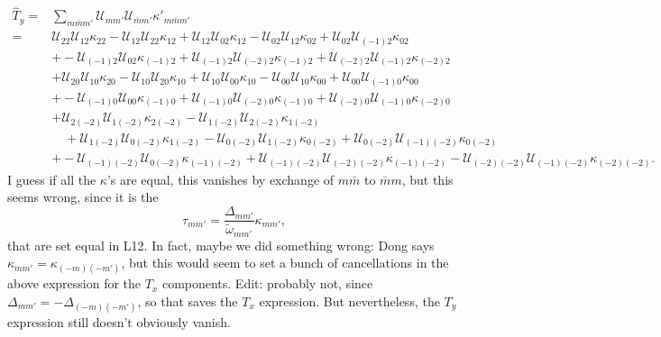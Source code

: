 \documentclass[12pt]{article}
\begin{document}
\begin{align}
    \hat{T}_y
        ={}&
            \sum\limits_{m\bar{m}m'}
            \mathcal{U}_{mm'}
            \mathcal{U}_{\bar{m}m'}
            \kappa'_{m\bar{m}m'}\nonumber\\
        ={}&
            \mathcal{U}_{22}\mathcal{U}_{12}\kappa_{22}
            - \mathcal{U}_{12}\mathcal{U}_{22}\kappa_{12}
            + \mathcal{U}_{12}\mathcal{U}_{02}\kappa_{12}
            - \mathcal{U}_{02}\mathcal{U}_{12}\kappa_{02}
            + \mathcal{U}_{02}\mathcal{U}_{(-1)2}\kappa_{02}\nonumber\\
        &+
            - \mathcal{U}_{(-1)2}\mathcal{U}_{02}\kappa_{(-1)2}
            + \mathcal{U}_{(-1)2}\mathcal{U}_{(-2)2}\kappa_{(-1)2}
            + \mathcal{U}_{(-2)2}\mathcal{U}_{(-1)2}\kappa_{(-2)2}\nonumber\\
        &+
            \mathcal{U}_{20}\mathcal{U}_{10}\kappa_{20}
            - \mathcal{U}_{10}\mathcal{U}_{20}\kappa_{10}
            + \mathcal{U}_{10}\mathcal{U}_{00}\kappa_{10}
            - \mathcal{U}_{00}\mathcal{U}_{10}\kappa_{00}
            + \mathcal{U}_{00}\mathcal{U}_{(-1)0}\kappa_{00}\nonumber\\
        &+
            - \mathcal{U}_{(-1)0}\mathcal{U}_{00}\kappa_{(-1)0}
            + \mathcal{U}_{(-1)0}\mathcal{U}_{(-2)0}\kappa_{(-1)0}
            + \mathcal{U}_{(-2)0}\mathcal{U}_{(-1)0}\kappa_{(-2)0}\nonumber\\
        &+
            \mathcal{U}_{2(-2)}\mathcal{U}_{1(-2)}\kappa_{2(-2)}
            - \mathcal{U}_{1(-2)}\mathcal{U}_{2(-2)}\kappa_{1(-2)}\nonumber\\
            &\quad + \mathcal{U}_{1(-2)}\mathcal{U}_{0(-2)}\kappa_{1(-2)}
            - \mathcal{U}_{0(-2)}\mathcal{U}_{1(-2)}\kappa_{0(-2)}
            + \mathcal{U}_{0(-2)}\mathcal{U}_{(-1)(-2)}\kappa_{0(-2)}\nonumber\\
        &+
            - \mathcal{U}_{(-1)(-2)}\mathcal{U}_{0(-2)}\kappa_{(-1)(-2)}
            + \mathcal{U}_{(-1)(-2)}\mathcal{U}_{(-2)(-2)}\kappa_{(-1)(-2)}
            - \mathcal{U}_{(-2)(-2)}\mathcal{U}_{(-1)(-2)}\kappa_{(-2)(-2)}.
\end{align}
I guess if all the $\kappa$'s are equal, this vanishes by exchange of $m\bar{m}$
to $\bar{m}m$, but this seems wrong, since it is the
\begin{equation}
    \tau_{mm'} = \frac{\Delta_{mm'}}{\tilde{\omega}_{mm'}}\kappa_{mm'},
\end{equation}
that are set equal in L12. In fact, maybe we did something wrong: Dong says
$\kappa_{mm'} = \kappa_{(-m)(-m')}$, but this would seem to set a bunch of
cancellations in the above expression for the $T_x$ components. Edit: probably
not, since $\Delta_{mm'} = -\Delta_{(-m)(-m')}$, so that saves the $T_x$
expression. But nevertheless, the $T_y$ expression still doesn't obviously
vanish.
\end{document}
